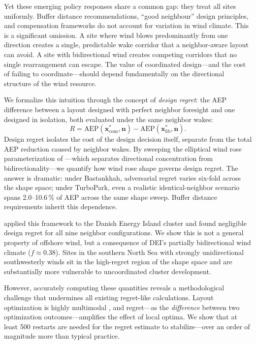 \documentclass[wes, manuscript]{copernicus}
\begin{document}
Yet these emerging policy responses share a common gap: they treat all sites uniformly.
Buffer distance recommendations, ``good neighbour'' design principles, and compensation frameworks do not account for variation in wind climate.
This is a significant omission.
A site where wind blows predominantly from one direction creates a single, predictable wake corridor that a neighbor-aware layout can avoid.
A site with bidirectional wind creates competing corridors that no single rearrangement can escape.
The value of coordinated design---and the cost of failing to coordinate---should depend fundamentally on the directional structure of the wind resource.

We formalize this intuition through the concept of \emph{design regret}: the AEP difference between a layout designed with perfect neighbor foresight and one designed in isolation, both evaluated under the same neighbor wakes:
\begin{equation}\label{eq:regret}
    R = \text{AEP}(\mathbf{x}^*_\text{cons}, \mathbf{n}) - \text{AEP}(\mathbf{x}^*_\text{lib}, \mathbf{n}).
\end{equation}
Design regret isolates the cost of the design decision itself, separate from the total AEP reduction caused by neighbor wakes.
By sweeping the elliptical wind rose parameterization of \citet{Hart2025}---which separates directional concentration from bidirectionality---we quantify how wind rose shape governs design regret.
The answer is dramatic: under Bastankhah, adversarial regret varies six-fold across the shape space; under TurboPark, even a realistic identical-neighbor scenario spans 2.0--10.6\,\% of AEP across the same shape sweep.
Buffer distance requirements inherit this dependence.

\citet{Quick2026omae} applied this framework to the Danish Energy Island cluster and found negligible design regret for all nine neighbor configurations.
We show this is not a general property of offshore wind, but a consequence of DEI's partially bidirectional wind climate ($f \approx 0.38$).
Sites in the southern North Sea with strongly unidirectional southwesterly winds sit in the high-regret region of the shape space and are substantially more vulnerable to uncoordinated cluster development.

However, accurately computing these quantities reveals a methodological challenge that undermines all existing regret-like calculations.
Layout optimization is highly multimodal \citep{Thomas2023, ValottaRodrigues2024}, and regret---as the \emph{difference} between two optimization outcomes---amplifies the effect of local optima.
We show that at least 500 restarts are needed for the regret estimate to stabilize---over an order of magnitude more than typical practice.
\end{document}
